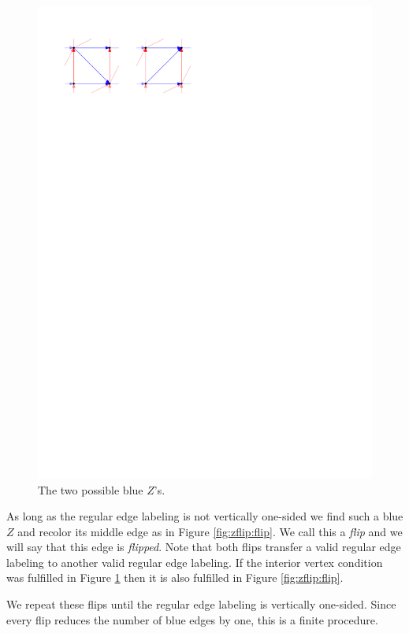   \begin{figure}[b]
    \centering
    \includegraphics[scale=1]{unifiedAlgo/img/zflip/blueZ.pdf}
    \caption{The two possible blue $Z$'s.}
    \label{fig:zflip:blueZ}
  \end{figure}

  As long as the regular edge labeling is not vertically one-sided we find such a blue $Z$ and recolor its middle edge as in Figure \ref{fig:zflip:flip}. We call this a \emph{flip} and we will say that this edge is \emph{flipped}.
  Note that both flips transfer a valid regular edge labeling to another valid regular edge labeling. If the interior vertex condition was fulfilled in Figure \ref{fig:zflip:blueZ} then it is also fulfilled in Figure \ref{fig:zflip:flip}.

  We repeat these flips until the regular edge labeling is vertically one-sided.
  Since every flip reduces the number of blue edges by one, this is a finite procedure.

